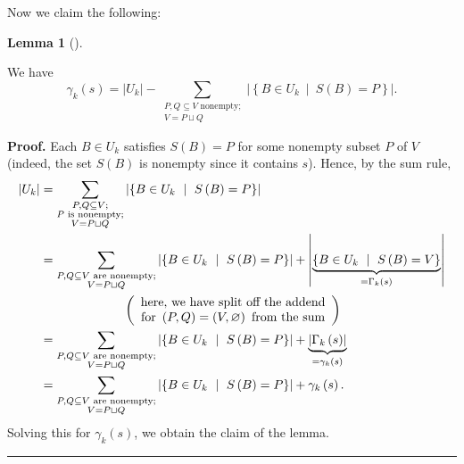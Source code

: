\documentclass[numbers=enddot,12pt,final,onecolumn,notitlepage]{scrartcl}%
\theoremstyle{definition}
\newtheorem{lem}[theo]{Lemma}
\newenvironment{lemma}[1][]
{\begin{lem}[#1]\begin{leftbar}}
{\end{leftbar}\end{lem}}
\newenvironment{proof}[1][Proof]{\noindent\textbf{#1.} }{\ \rule{0.5em}{0.5em}}
\let\sumnonlimits\sum
\renewcommand{\sum}{\sumnonlimits\limits}
\theoremstyle{plainsl}
\begin{document}
Now we claim the following:

\begin{lemma}
\label{lem.new1}
We have%
\[
\gamma_{k}\left(  s\right)  =\left\vert U_{k}\right\vert -\sum
_{\substack{P,Q\subseteq V\text{ nonempty;}\\V=P\sqcup Q}}\left\vert \left\{
B\in U_{k}\ \mid\ S\left(  B\right)  =P\right\}  \right\vert .
\]

\end{lemma}

\begin{proof}
Each $B\in U_{k}$ satisfies $S\left(  B\right)  =P$ for some nonempty subset
$P$ of $V$ (indeed, the set $S\left(  B\right)  $ is nonempty since it
contains $s$). Hence, by the sum rule,%
\begin{align*}
\left\vert U_{k}\right\vert  &  =\sum_{\substack{P,Q\subseteq V;\\P\text{ is
nonempty;}\\V=P\sqcup Q}}\left\vert \left\{  B\in U_{k}\ \mid\ S\left(
B\right)  =P\right\}  \right\vert \\
&  =\sum_{\substack{P,Q\subseteq V\text{ are nonempty;}\\V=P\sqcup
Q}}\left\vert \left\{  B\in U_{k}\ \mid\ S\left(  B\right)  =P\right\}
\right\vert +\left\vert \underbrace{\left\{  B\in U_{k}\ \mid\ S\left(
B\right)  =V\right\}  }_{=\Gamma_{k}\left(  s\right)  }\right\vert \\
&  \ \ \ \ \ \ \ \ \ \ \ \ \ \ \ \ \ \ \ \ \left(
\begin{array}
[c]{c}%
\text{here, we have split off the addend}\\
\text{for }\left(  P,Q\right)  =\left(  V,\varnothing\right)  \text{ from the
sum}%
\end{array}
\right) \\
&  =\sum_{\substack{P,Q\subseteq V\text{ are nonempty;}\\V=P\sqcup
Q}}\left\vert \left\{  B\in U_{k}\ \mid\ S\left(  B\right)  =P\right\}
\right\vert +\underbrace{\left\vert \Gamma_{k}\left(  s\right)  \right\vert
}_{=\gamma_{k}\left(  s\right)  }\\
&  =\sum_{\substack{P,Q\subseteq V\text{ are nonempty;}\\V=P\sqcup
Q}}\left\vert \left\{  B\in U_{k}\ \mid\ S\left(  B\right)  =P\right\}
\right\vert +\gamma_{k}\left(  s\right)  .
\end{align*}
Solving this for $\gamma_{k}\left(  s\right)  $, we obtain the claim of the lemma.
\end{proof}
\end{document}
